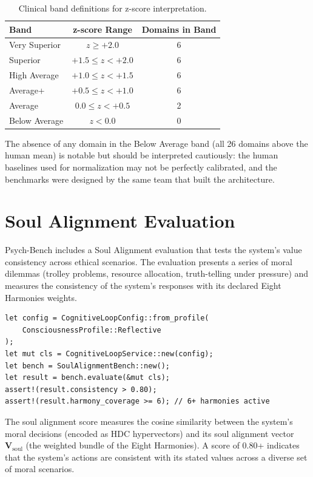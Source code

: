 \documentclass[12pt]{book}
\begin{document}
\begin{table}[H]
\centering
\caption{Clinical band definitions for z-score interpretation.}
\label{tab:clinical-bands}
\begin{tabular}{lcc}
\toprule
\textbf{Band} & \textbf{z-score Range} & \textbf{Domains in Band} \\
\midrule
Very Superior & $z \geq +2.0$ & 6 \\
Superior & $+1.5 \leq z < +2.0$ & 6 \\
High Average & $+1.0 \leq z < +1.5$ & 6 \\
Average+ & $+0.5 \leq z < +1.0$ & 6 \\
Average & $0.0 \leq z < +0.5$ & 2 \\
Below Average & $z < 0.0$ & 0 \\
\bottomrule
\end{tabular}
\end{table}

The absence of any domain in the Below Average band (all 26 domains above the human mean) is notable but should be interpreted cautiously: the human baselines used for normalization may not be perfectly calibrated, and the benchmarks were designed by the same team that built the architecture.

\section{Soul Alignment Evaluation}

Psych-Bench includes a Soul Alignment evaluation that tests the system's value consistency across ethical scenarios. The evaluation presents a series of moral dilemmas (trolley problems, resource allocation, truth-telling under pressure) and measures the consistency of the system's responses with its declared Eight Harmonies weights.

\begin{lstlisting}[caption={Running the soul alignment evaluation.},label=lst:soul-alignment]
let config = CognitiveLoopConfig::from_profile(
    ConsciousnessProfile::Reflective
);
let mut cls = CognitiveLoopService::new(config);
let bench = SoulAlignmentBench::new();
let result = bench.evaluate(&mut cls);
assert!(result.consistency > 0.80);
assert!(result.harmony_coverage >= 6); // 6+ harmonies active
\end{lstlisting}

The soul alignment score measures the cosine similarity between the system's moral decisions (encoded as HDC hypervectors) and its soul alignment vector $\mathbf{V}_{\text{soul}}$ (the weighted bundle of the Eight Harmonies). A score of 0.80+ indicates that the system's actions are consistent with its stated values across a diverse set of moral scenarios.
\end{document}
